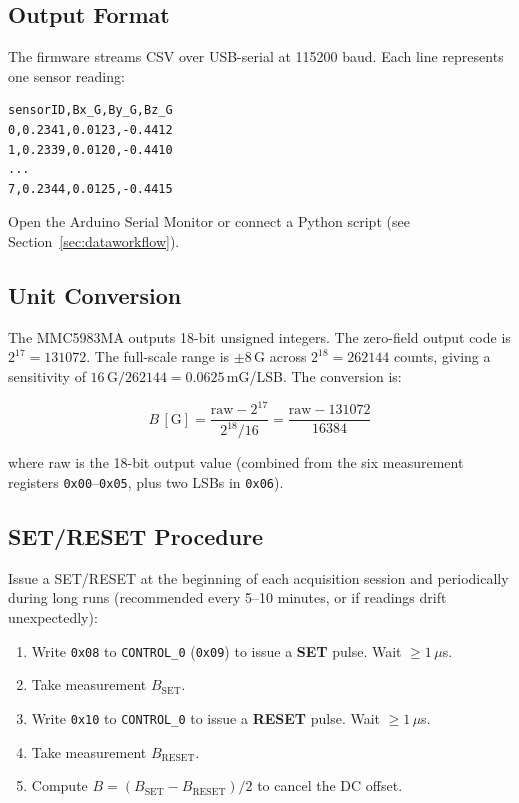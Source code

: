 \documentclass[12pt]{article}
\begin{document}
\subsection{Output Format}

The firmware streams CSV over USB-serial at 115200 baud. Each line
represents one sensor reading:

\begin{lstlisting}
sensorID,Bx_G,By_G,Bz_G
0,0.2341,0.0123,-0.4412
1,0.2339,0.0120,-0.4410
...
7,0.2344,0.0125,-0.4415
\end{lstlisting}

Open the Arduino Serial Monitor or connect a Python script
(see Section~\ref{sec:dataworkflow}).

\subsection{Unit Conversion}

The MMC5983MA outputs 18-bit unsigned integers. The zero-field output
code is $2^{17} = 131072$. The full-scale range is $\pm8$\,G across
$2^{18} = 262144$ counts, giving a sensitivity of
$16\,\text{G} / 262144 = 0.0625$\,mG/LSB. The conversion is:

\begin{equation}
  B\,[\text{G}] = \frac{\text{raw} - 2^{17}}{2^{18}/16}
               = \frac{\text{raw} - 131072}{16384}
  \label{eq:conversion}
\end{equation}

where raw is the 18-bit output value (combined from the six measurement
registers \texttt{0x00}--\texttt{0x05}, plus two LSBs in \texttt{0x06}).

\subsection{SET/RESET Procedure}
\label{sec:setresetproc}

Issue a SET/RESET at the beginning of each acquisition session and
periodically during long runs (recommended every 5--10 minutes, or if
readings drift unexpectedly):

\begin{enumerate}
  \item Write \texttt{0x08} to \texttt{CONTROL\_0} (\texttt{0x09}) to
        issue a \textbf{SET} pulse. Wait $\geq1\,\mu$s.
  \item Take measurement $B_\text{SET}$.
  \item Write \texttt{0x10} to \texttt{CONTROL\_0} to issue a
        \textbf{RESET} pulse. Wait $\geq1\,\mu$s.
  \item Take measurement $B_\text{RESET}$.
  \item Compute $B = (B_\text{SET} - B_\text{RESET})/2$ to cancel the
        DC offset.
\end{enumerate}
\end{document}

